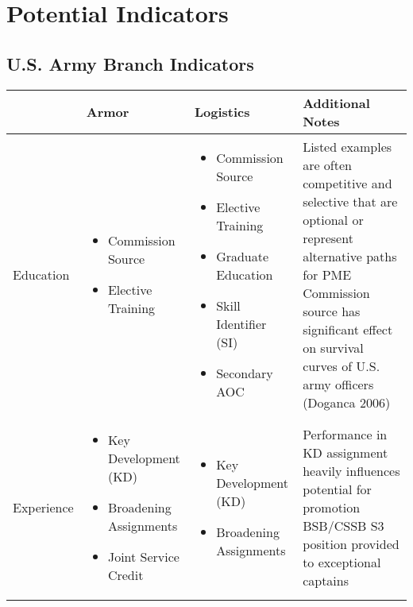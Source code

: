 \documentclass[12pt]{article}
\begin{document}
\section*{Potential Indicators}

\subsection*{U.S. Army Branch Indicators}

\newcommand{\rr}{\raggedright}
\newcommand{\tn}{\tabularnewline}

\begin{tabularx}{6.5in}{|l|X|X|X|}

\hline
 & Armor & Logistics & Additional Notes \\
\hline
Education &
\begin{itemize}
    \item Commission Source
    \item Elective Training
\end{itemize}
&
\begin{itemize}
    \item Commission Source
    \item Elective Training
    \item Graduate Education
    \item Skill Identifier (SI)
    \item Secondary AOC
\end{itemize}
&
\rr
Listed examples are often competitive and selective that are optional or represent alternative paths for PME \newline
Commission source has significant effect on survival curves of U.S. army officers (Doganca 2006)
\tn
\hline
Experience &
\rr
\begin{itemize}
    \item Key Development (KD)
    \item Broadening Assignments
    \item Joint Service Credit
\end{itemize}
 &
\rr
\begin{itemize}
    \item Key Development (KD)
    \item Broadening Assignments
\end{itemize}
&
\rr
Performance in KD assignment heavily influences potential for promotion \newline
BSB/CSSB S3 position provided to exceptional captains \newline

\end{tabularx}
\end{document}
